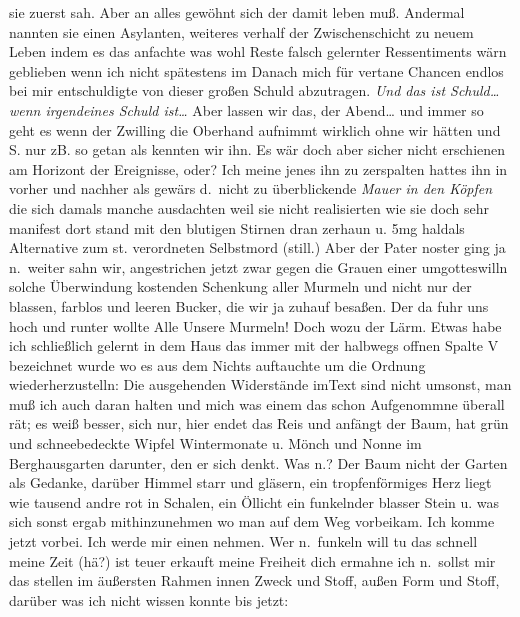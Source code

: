 \documentclass[
]{article}
\begin{document}
sie zuerst sah. Aber an alles gewöhnt sich der damit leben muß. Andermal
nannten sie einen Asylanten, weiteres verhalf der Zwischenschicht zu
neuem Leben indem es das anfachte was wohl Reste falsch gelernter
Ressentiments wärn geblieben wenn ich nicht spätestens im Danach mich
für vertane Chancen endlos bei mir entschuldigte von dieser großen
Schuld abzutragen. \emph{Und das ist Schuld\ldots{} wenn irgendeines
Schuld ist\ldots{}} Aber lassen wir das, der Abend\ldots{} und immer so
geht es wenn der Zwilling die Oberhand aufnimmt wirklich ohne wir hätten
und S. nur zB. so getan als kennten wir ihn. Es wär doch aber sicher
nicht erschienen am Horizont der Ereignisse, oder? Ich meine jenes ihn
zu zerspalten hattes ihn in vorher und nachher als gewärs d.~nicht zu
überblickende \emph{Mauer in den Köpfen} die sich damals manche
ausdachten weil sie nicht realisierten wie sie doch sehr manifest dort
stand mit den blutigen Stirnen dran zerhaun u. 5mg haldals Alternative
zum st. verordneten Selbstmord (still.) Aber der Pater noster ging ja
n.~weiter sahn wir, angestrichen jetzt zwar gegen die Grauen einer
umgotteswilln solche Überwindung kostenden Schenkung aller Murmeln und
nicht nur der blassen, farblos und leeren Bucker, die wir ja zuhauf
besaßen. Der da fuhr uns hoch und runter wollte Alle Unsere Murmeln!
Doch wozu der Lärm. Etwas habe ich schließlich gelernt in dem Haus das
immer mit der halbwegs offnen Spalte V bezeichnet wurde wo es aus dem
Nichts auftauchte um die Ordnung wiederherzustelln: Die ausgehenden
Widerstände imText sind nicht umsonst, man muß ich auch daran halten und
mich was einem das schon Aufgenommne überall rät; es weiß besser, sich
nur, hier endet das Reis und anfängt der Baum, hat grün und
schneebedeckte Wipfel Wintermonate u. Mönch und Nonne im Berghausgarten
darunter, den er sich denkt. Was n.? Der Baum nicht der Garten als
Gedanke, darüber Himmel starr und gläsern, ein tropfenförmiges Herz
liegt wie tausend andre rot in Schalen, ein Öllicht ein funkelnder
blasser Stein u. was sich sonst ergab mithinzunehmen wo man auf dem Weg
vorbeikam. Ich komme jetzt vorbei. Ich werde mir einen nehmen. Wer
n.~funkeln will tu das schnell meine Zeit (hä?) ist teuer erkauft meine
Freiheit dich ermahne ich n.~sollst mir das stellen im äußersten Rahmen
innen Zweck und Stoff, außen Form und Stoff, darüber was ich nicht
wissen konnte bis jetzt:
\end{document}
